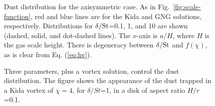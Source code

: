 \documentclass[apj]{emulateapj}
\newcommand{\Eq}[1]{Eq. (\ref{#1})}
\newcommand{\eq}[1]{\Eq{#1}}
\newcommand{\Fig}[1]{Fig.~\ref{#1}}
\newcommand{\fig}[1]{\Fig{#1}}
\begin{document}
\begin{figure}
  \begin{center}
  \end{center}
\caption[]{Dust distribution for the axisymmetric case. As in
  \fig{fig:scale-function}, red and blue lines are for the Kida and
  GNG solutions, respectively. Distributions for $\delta/{\rm St}$=0.1, 1, and
  10 are shown (dashed, solid, and dot-dashed lines). The $x$-axis is
  $a/H$, where $H$ is the gas scale height. There is degeneracy
  between $\delta/{\rm St}$ and $f(\chi)$, as is clear from \eq{eq:hv}.}
 \label{fig:gaussian}
\end{figure}

\begin{figure}
\begin{center}
 \end{center}
\caption[]{Three parameters, plus a vortex solution, control the dust distribution. 
The figure shows the appearance of the dust trapped in a Kida vortex of $\chi=4$, 
for $\delta/St$=1, in a disk of aspect ratio $H/r$=0.1.}
 \label{fig:disk}
\end{figure}
\end{document}
